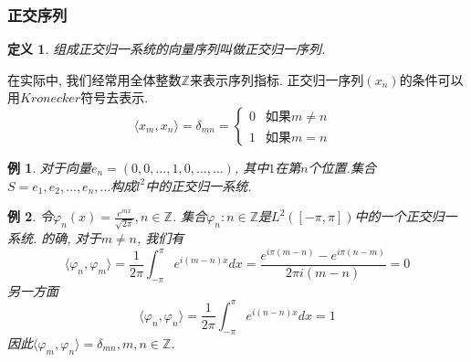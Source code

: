 \documentclass[a4paper,11pt]{book}
\newtheorem{definition}{\hspace{2em}定义}[section]
\newtheorem{example}{例}[section]
\begin{document}
\subsubsection*{正交序列}
\begin{definition}
  组成正交归一系统的向量序列叫做正交归一序列.
\end{definition}
在实际中, 我们经常用全体整数$\mathbb{Z}$来表示序列指标. 正交归一序列$(x_n)$的条件可以用$Kronecker$符号去表示.
\begin{equation*}
  \langle x_m,x_n\rangle=\delta_{mn}=\begin{cases}
                                       0 & \text{如果$m\neq n$ }\\
                                       1 & \text{如果$m=n$}
                                     \end{cases}
\end{equation*}
\begin{example}
  对于向量$e_n=(0,0,\dots,1,0,\dots,\dots)$, 其中$1$在第$n$个位置.集合$S={e_1,e_2,\dots,e_n,\dots}$构成$l^2$中的正交归一系统.
\end{example}
\begin{example}
  令$\varphi_n(x)=\frac{e^{inx}}{\sqrt{2\pi}},n\in \mathbb{Z}$. 集合${\varphi_n:n\in\mathbb{Z}}$是$L^2([-\pi,\pi])$中的一个正交归一系统. 的确, 对于$m\neq n$, 我们有
  \begin{equation*}
    \langle\varphi_n,\varphi_m\rangle=\frac{1}{2\pi}\int_{-\pi}^{\pi}e^{i(m-n)x}dx=\frac{e^{i\pi(m-n)}-e^{i\pi(n-m)}}{2\pi i(m-n)}=0
  \end{equation*}
  另一方面
  \begin{equation*}
    \langle\varphi_n,\varphi_n\rangle=\frac{1}{2\pi}\int_{-\pi}^{\pi}e^{i(n-n)x}dx=1
  \end{equation*}
  因此$\langle\varphi_m,\varphi_n\rangle=\delta_{mn},m,n\in\mathbb{Z}$.
\end{example}
\end{document}
